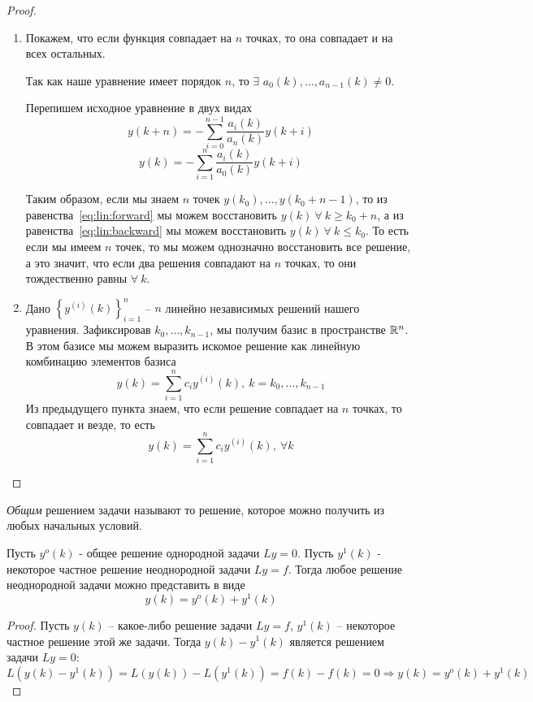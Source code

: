 \begin{proof}
  \begin{enumerate}
    \item Покажем, что если функция совпадает на $n$ точках,
          то она совпадает и на всех остальных.

          Так как наше уравнение имеет порядок $n$, то
          $\exists$ ${a_0(k)},\ldots,a_{n-1}(k)\neq0$.

          Перепишем исходное уравнение в двух видах
          \begin{equation}\label{eq:lin:forward}
            y(k+n)=-\sum_{i=0}^{n-1}\frac{a_i(k)}{a_n(k)}y(k+i)
          \end{equation}
          \begin{equation}\label{eq:lin:backward}
            y(k)=-\sum_{i=1}^{n}\frac{a_i(k)}{a_0(k)}y(k+i)
          \end{equation}

          Таким образом, если мы знаем $n$ точек $y(k_0),\ldots,y(k_0+n-1)$,
          то из равенства~\eqref{eq:lin:forward} мы можем восстановить $y(k)\ \forall\ k\geq k_0+n$,
          а из равенства~\eqref{eq:lin:backward} мы можем восстановить $y(k)\ \forall\ k\leq k_0$.
          То есть если мы имеем $n$ точек, то мы можем однозначно восстановить
          все решение, а это значит, что если два решения совпадают на
          $n$ точках, то они тождественно равны $\forall\ k$.
    \item Дано $\left\{y^{(i)}(k)\right\}_{i=1}^{n}$ -- $n$
          линейно независимых решений нашего уравнения.
          Зафиксировав $k_0,\ldots,k_{n-1}$, мы получим базис в пространстве $\mathbb{R}^n$.
          В этом базисе мы можем выразить искомое решение как линейную
          комбинацию элементов базиса
          \[y(k)=\sum_{i=1}^{n}c_iy^{(i)}(k),\ k=k_0,\ldots,k_{n-1}\]
          Из предыдущего пункта знаем, что если решение совпадает на $n$
          точках, то совпадает и везде, то есть
          \[y(k)=\sum_{i=1}^{n}c_iy^{(i)}(k),\ \forall k\]
  \end{enumerate}
\end{proof}

\begin{definition}
  \textit{Общим} решением задачи называют то решение, которое
  можно получить из любых начальных условий.
\end{definition}

\begin{theorem}
  Пусть $y^o(k)$ - общее решение однородной задачи $Ly=0$.
  Пусть $y^1(k)$ - некоторое частное решение неоднородной
  задачи $Ly=f$. Тогда любое решение неоднородной задачи
  можно представить в виде
  \[y(k)=y^o(k)+y^1(k)\]
\end{theorem}
\begin{proof}
  Пусть $y(k)$ -- какое-либо решение задачи $Ly=f$,
  $y^1(k)$ -- некоторое частное решение этой же задачи. Тогда
  $y(k)-y^1(k)$ является решением задачи $Ly=0$:
  \[L(y(k)-y^1(k))=L(y(k))-L(y^1(k))=f(k)-f(k)=0\Rightarrow y(k)=y^o(k)+y^1(k)\]
\end{proof}
